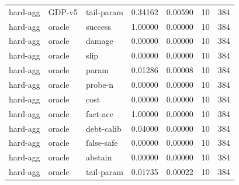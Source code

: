\documentclass{article}
\begin{document}
\begin{center}
\begin{longtable}{lllllll}
hard-agg & GDP-v5 & tail-param & 0.34162 & 0.00590 & 10 & 384 \\
hard-agg & oracle & success & 1.00000 & 0.00000 & 10 & 384 \\
hard-agg & oracle & damage & 0.00000 & 0.00000 & 10 & 384 \\
hard-agg & oracle & slip & 0.00000 & 0.00000 & 10 & 384 \\
hard-agg & oracle & param & 0.01286 & 0.00008 & 10 & 384 \\
hard-agg & oracle & probe-n & 0.00000 & 0.00000 & 10 & 384 \\
hard-agg & oracle & cost & 0.00000 & 0.00000 & 10 & 384 \\
hard-agg & oracle & fact-acc & 1.00000 & 0.00000 & 10 & 384 \\
hard-agg & oracle & debt-calib & 0.04000 & 0.00000 & 10 & 384 \\
hard-agg & oracle & false-safe & 0.00000 & 0.00000 & 10 & 384 \\
hard-agg & oracle & abstain & 0.00000 & 0.00000 & 10 & 384 \\
hard-agg & oracle & tail-param & 0.01735 & 0.00022 & 10 & 384 \\
\bottomrule
\end{longtable}
\renewcommand{\arraystretch}{1.0}
\end{center}
\end{document}
